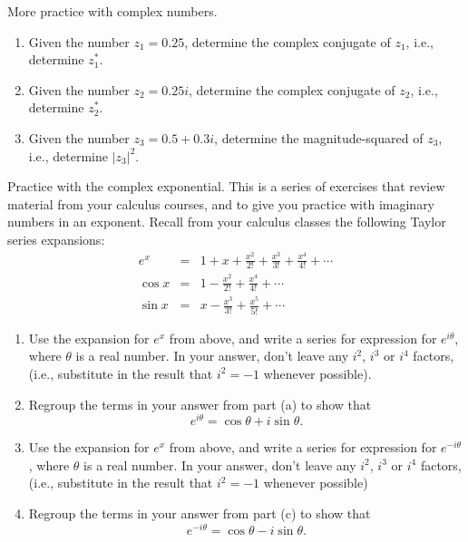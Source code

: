 \begin{aproblem}{More practice with complex numbers.}
  \begin{enumerate}
  \item Given the number $z_1 = 0.25$, determine the complex conjugate
    of $z_1$, i.e., determine $z_1^\ast$.
  \item Given the number $z_2 = 0.25i$, determine the complex
    conjugate of $z_2$, i.e., determine $z_2^\ast$.
  \item Given the number $z_3 = 0.5 + 0.3i$, determine the
    magnitude-squared of $z_3$, i.e., determine $\vert z_3\vert^2$.
  \end{enumerate}
\end{aproblem}


\begin{aproblem}{Practice with the complex exponential.}  
  This is a series of exercises that review material from your
  calculus courses, and to give you practice with imaginary numbers in
  an exponent.  Recall from your calculus classes the following Taylor
  series expansions:
  \label{prob:ComplexPractice}
  \begin{eqnarray}
    e^x &=&  1+ x +\frac{x^2}{2!}+\frac{x^3}{3!}+ \frac{x^4}{4!} + \cdots
    \nonumber \\
    \cos x &=& 1 - \frac{x^2}{2!} + \frac{x^4}{4!} + \cdots 
    \nonumber \\
    \sin x &=&  x- \frac{x^3}{3!} + \frac{x^5}{5!} + \cdots
    \nonumber 
  \end{eqnarray}
  
  \begin{enumerate}
  \item Use the expansion for $e^x$ from above, and write a series for
    expression for $e^{i\theta}$, where $\theta$ is a real number.  In
    your answer, don't leave any $i^2$, $i^3$ or $i^4$ factors, (i.e.,
    substitute in the result that $i^2=-1$ whenever possible).

  \item Regroup the terms in your answer from part (a) to show that
    \[  e^{i\theta}=\cos\theta +i\sin\theta.  \]

  \item Use the expansion for $e^x$ from above, and write a series for
    expression for $e^{-i\theta}$, where $\theta$ is a real number.
    In your answer, don't leave any $i^2$, $i^3$ or $i^4$ factors,
    (i.e., substitute in the result that $i^2=-1$ whenever possible)

  \item Regroup the terms in your answer from part (c) to show that
    \[  e^{-i\theta}=\cos\theta - i\sin\theta.  \]


\end{enumerate}
\end{aproblem}
